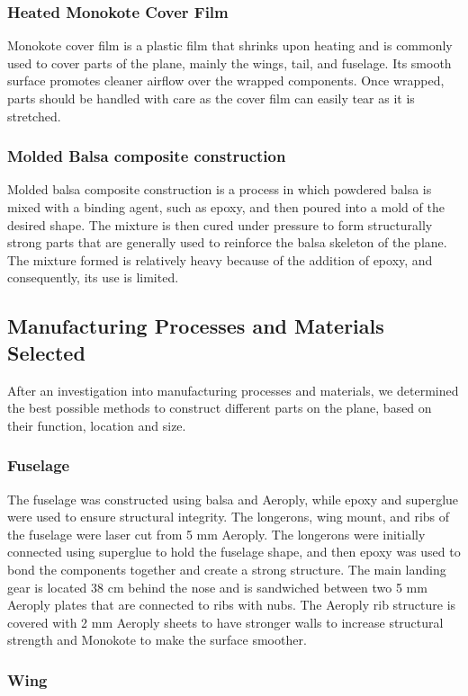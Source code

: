 \documentclass[10pt, letterpaper]{article}
\newcommand{\Filler}{}
\begin{document}
\subsubsection{Heated Monokote Cover Film}
Monokote cover film is a plastic film that shrinks upon heating and is commonly used to cover parts of the plane, mainly the wings, tail, and fuselage. Its smooth surface promotes cleaner airflow over the wrapped components. Once wrapped, parts should be handled with care as the cover film can easily tear as it is stretched.
\Filler
\subsubsection{Molded Balsa composite construction}
Molded balsa composite construction is a process in which powdered balsa is mixed with a binding agent, such as epoxy, and then poured into a mold of the desired shape. The mixture is then cured under pressure to form structurally strong parts that are generally used to reinforce the balsa skeleton of the plane. The mixture formed is relatively heavy because of the addition of epoxy, and consequently, its use is limited.
\Filler

\subsection{Manufacturing Processes and Materials Selected}
After an investigation into manufacturing processes and materials, we determined the best possible methods to construct different parts on the plane, based on their function, location and size.
\subsubsection{Fuselage}
 The fuselage was constructed using balsa and Aeroply, while epoxy and superglue were used to ensure structural integrity. The longerons, wing mount, and ribs of the fuselage were laser cut from 5 mm Aeroply. The longerons were initially connected using superglue to hold the fuselage shape, and then epoxy was used to bond the components together and create a strong structure. The main landing gear is located 38 cm behind the nose and is sandwiched between two 5 mm Aeroply plates that are connected to ribs with nubs. The Aeroply rib structure is covered with 2 mm Aeroply sheets to have stronger walls to increase structural strength and Monokote to make the surface smoother.
\Filler
\subsubsection{Wing}
\end{document}
